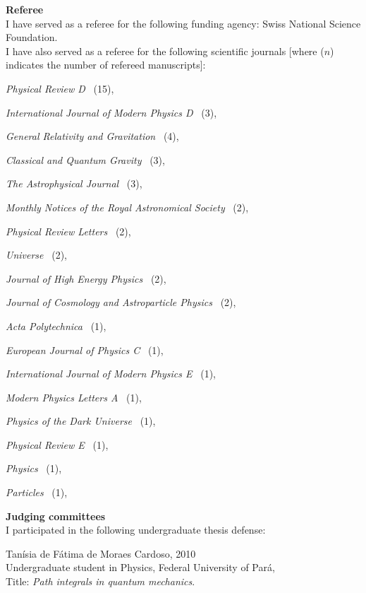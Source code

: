 \documentclass[10pt]{article}
\newcommand{\blankline}{\quad\pagebreak[3]}
\begin{document}
\textbf{Referee} \\
I have served as a referee for the following funding agency:
Swiss National Science Foundation. \\

I have also served as a referee for the following scientific journals [where ($n$)
indicates the number of refereed manuscripts]:
\blankline
\vspace{0.25cm}
\begin{innerlist}
    \item \emph{Physical Review D} \dotfill\, (15),
    \item \emph{International Journal of Modern Physics D} \dotfill\, (3),
    \item \emph{General Relativity and Gravitation} \dotfill\, (4),
    \item \emph{Classical and Quantum Gravity} \dotfill\, (3),
    \item \emph{The Astrophysical Journal} \dotfill\, (3),
    \item \emph{Monthly Notices of the Royal Astronomical Society} \dotfill\, (2),
    \item \emph{Physical Review Letters} \dotfill\, (2),
    \item \emph{Universe} \dotfill\, (2),
    \item \emph{Journal of High Energy Physics} \dotfill\, (2),
    \item \emph{Journal of Cosmology and Astroparticle Physics} \dotfill\, (2),
    \item \emph{Acta Polytechnica} \dotfill\, (1),
    \item \emph{European Journal of Physics C} \dotfill\, (1),
    \item \emph{International Journal of Modern Physics E} \dotfill\, (1),
    \item \emph{Modern Physics Letters A} \dotfill\, (1),
    \item \emph{Physics of the Dark Universe} \dotfill\, (1),
    \item \emph{Physical Review E} \dotfill\, (1),
    \item \emph{Physics} \dotfill\, (1),
    \item \emph{Particles} \dotfill\, (1),
\end{innerlist}

\blankline

\textbf{Judging committees} \\
I participated in the following undergraduate thesis defense:
\begin{bibenum}
    \item {Tan\'isia de F\'atima de Moraes Cardoso}, \hfill{2010} \\
        Undergraduate student in Physics, Federal University of Par\'a, \\
        Title: \emph{Path integrals in quantum mechanics}.
\end{bibenum}
\end{document}
